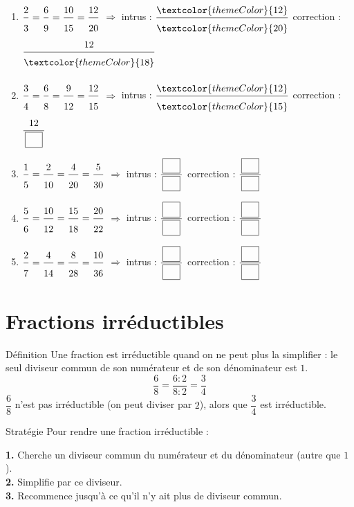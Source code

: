 \vfill
{}

\begin{enumerate}[leftmargin=*,align=parleft, label=\alph*), itemsep=9pt]
\item $\FA{2}{3}=\FA{6}{9}=\FA{10}{15}=\FA{12}{20}$ \quad $\Longrightarrow$ \quad intrus : $\FA{\textcolor{themeColor}{12}}{\textcolor{themeColor}{20}}$ \quad correction : $\FA{12}{\textcolor{themeColor}{18}}$
\item $\FA{3}{4}=\FA{6}{8}=\FA{9}{12}=\FA{12}{15}$ \quad $\Longrightarrow$ \quad intrus : $\FA{\textcolor{themeColor}{12}}{\textcolor{themeColor}{15}}$ \quad correction : $\FA{12}{\CaseC}$
\item $\FA{1}{5}=\FA{2}{10}=\FA{4}{20}=\FA{5}{30}$ \quad $\Longrightarrow$ \quad intrus : $\FA{\CaseC}{\CaseC}$ \quad correction : $\FA{\CaseC}{\CaseC}$
\item $\FA{5}{6}=\FA{10}{12}=\FA{15}{18}=\FA{20}{22}$ \quad $\Longrightarrow$ \quad intrus : $\FA{\CaseC}{\CaseC}$ \quad correction : $\FA{\CaseC}{\CaseC}$
\item $\FA{2}{7}=\FA{4}{14}=\FA{8}{28}=\FA{10}{36}$ \quad $\Longrightarrow$ \quad intrus : $\FA{\CaseC}{\CaseC}$ \quad correction : $\FA{\CaseC}{\CaseC}$
\end{enumerate}

\newpage
\section{Fractions irréductibles}\label{sec:FractionsIrreductibles}

\begin{regle}{Définition}
Une fraction est \textcolor{themeColor}{irréductible} quand on ne peut plus la simplifier : le seul diviseur commun de son numérateur et de son dénominateur est $1$.
\[\dfrac{6}{8}=\dfrac{6 : 2}{8 : 2}=\dfrac{3}{4}\]
$\dfrac{6}{8}$ n'est pas irréductible (on peut diviser par $2$), alors que $\dfrac{3}{4}$ est irréductible.
\end{regle}

\vspace{15pt}
\begin{astuce}{Stratégie}
Pour rendre une fraction irréductible :

\vspace{5pt}
\textbf{1.} Cherche un diviseur commun du numérateur et du dénominateur (autre que $1$).\\
\textbf{2.} Simplifie par ce diviseur.\\
\textbf{3.} Recommence jusqu'à ce qu'il n'y ait plus de diviseur commun.
\end{astuce}

